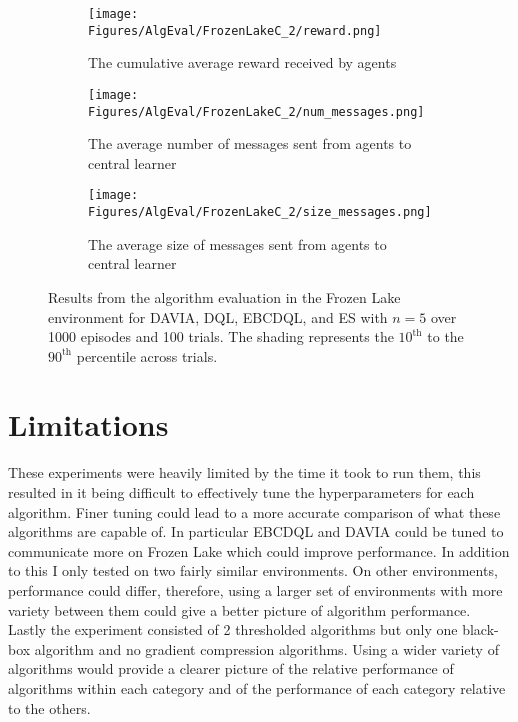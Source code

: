 \begin{figure}[H]
    \centering
    \begin{subfigure}{0.5\textwidth}
        \centering
        \texttt{[image: Figures/AlgEval/FrozenLakeC\_2/reward.png]}
        \caption{The cumulative average reward received by agents}
        \label{fig:EvalFLReward}
    \end{subfigure}
    \begin{subfigure}{0.5\textwidth}
        \centering
        \texttt{[image: Figures/AlgEval/FrozenLakeC\_2/num\_messages.png]}
        \caption{The average number of messages sent from agents to central learner}
        \label{fig:EvalFLNumMessages}
    \end{subfigure}
    \begin{subfigure}{0.5\textwidth}
        \centering
        \texttt{[image: Figures/AlgEval/FrozenLakeC\_2/size\_messages.png]}
        \caption{The average size of messages sent from agents to central learner}
        \label{fig:EvalFLSizeMessages}
    \end{subfigure}
    \caption{Results from the algorithm evaluation in the Frozen Lake environment for DAVIA, DQL, EBCDQL, and ES with $n=5$ over 1000 episodes and 100 trials. The shading represents the $10^\text{th}$ to the $90^{\text{th}}$ percentile across trials.}
    \label{fig:EvalFL}
\end{figure}

\section{Limitations}
These experiments were heavily limited by the time it took to run them, this resulted in it being difficult to effectively tune the hyperparameters for each algorithm. Finer tuning could lead to a more accurate comparison of what these algorithms are capable of. In particular EBCDQL and DAVIA could be tuned to communicate more on Frozen Lake which could improve performance.
In addition to this I only tested on two fairly similar environments. On other environments, performance could differ, therefore, using a larger set of environments with more variety between them could give a better picture of algorithm performance. Lastly the experiment consisted of 2 thresholded algorithms but only one black-box algorithm and no gradient compression algorithms. Using a wider variety of algorithms would provide a clearer picture of the relative performance of algorithms within each category and of the performance of each category relative to the others.

